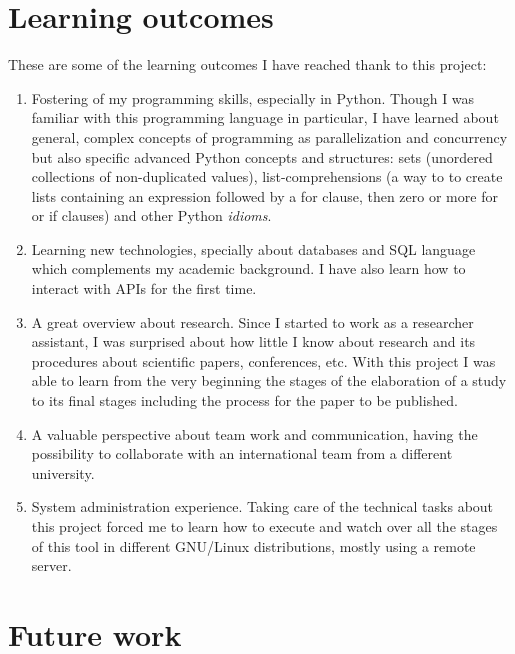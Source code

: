 \documentclass[a4paper, 12pt]{book}
\begin{document}
\section{Learning outcomes}
\label{sec:learning-outcomes}
These are some of the learning outcomes I have reached thank to this project:
\begin{enumerate}
  \item Fostering of my programming skills, especially in Python. Though I was familiar with
  this programming language in particular, I have learned about general, complex concepts of programming
  as parallelization and concurrency but also specific advanced Python concepts and structures:
  sets (unordered collections of non-duplicated values), list-comprehensions
  (a way to to create lists containing an expression followed by a for clause, then
  zero or more for or if clauses) and other Python \textit{idioms}.
  \item Learning new technologies, specially about databases and SQL language which
  complements my academic background. I have also learn how to interact with APIs for the first time.
  \item A great overview about research. Since I started to work as a researcher assistant,
  I was surprised about how little I know about research and its procedures about scientific papers,
  conferences, etc. With this project I was able to learn from the very beginning the stages of the elaboration
  of a study to its final stages including the process for the paper to be published.
  \item A valuable perspective about team work and communication, having the possibility
  to collaborate with an international team from a different university.
  \item System administration experience. Taking care of the technical tasks about this project forced me
  to learn how to execute and watch over all the stages of this tool in different GNU/Linux distributions,
  mostly using a remote server.
\end{enumerate}

\section{Future work}
\label{sec:future-work}
\end{document}
